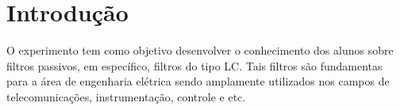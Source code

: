 \newpage

\section{Introdução}
O experimento tem como objetivo desenvolver o conhecimento dos alunos sobre filtros passivos, em específico, filtros do tipo LC. Tais filtros são fundamentas para a área de engenharia elétrica sendo amplamente utilizados nos campos de telecomunicações, instrumentação, controle e etc. 
